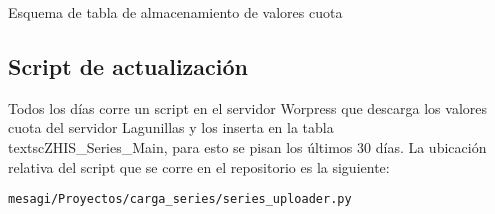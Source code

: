 \documentclass{article}
\begin{document}
\begin{table}[h]
{\small
{}}
\caption{Esquema de tabla de almacenamiento de valores cuota}
\label{bmk-sch}
\end{table}



\subsection{Script de actualización}

Todos los días corre un script en el servidor Worpress que descarga los valores cuota del servidor Lagunillas y los inserta en la tabla \\textsc{ZHIS\_Series\_Main}, para esto se pisan los últimos 30 días. La ubicación relativa del script que se corre en el repositorio es la siguiente:
\begin{center}
\texttt{mesagi/Proyectos/carga\_series/series\_uploader.py}
\end{center}
\end{document}
